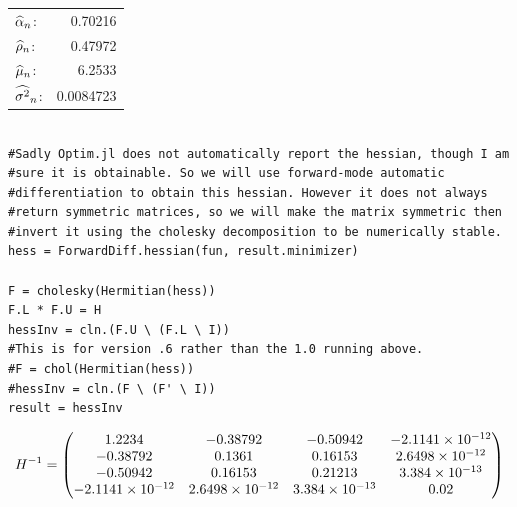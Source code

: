 \documentclass[12pt, letterpaper]{paper}
\begin{document}
\begin{center}
\begin{tabular}{lr}
\(\widehat{ \alpha }_{n}\): & 0.70216\\
\(\widehat{ \rho }_{n}\): & 0.47972\\
\(\widehat{ \mu }_{n}\): & 6.2533\\
\(\widehat{ \sigma^{2} }_{n}\): & 0.0084723\\
\end{tabular}
\end{center}

\begin{verbatim}

#Sadly Optim.jl does not automatically report the hessian, though I am
#sure it is obtainable. So we will use forward-mode automatic
#differentiation to obtain this hessian. However it does not always
#return symmetric matrices, so we will make the matrix symmetric then
#invert it using the cholesky decomposition to be numerically stable.
hess = ForwardDiff.hessian(fun, result.minimizer)

F = cholesky(Hermitian(hess))
F.L * F.U = H
hessInv = cln.(F.U \ (F.L \ I))
#This is for version .6 rather than the 1.0 running above.
#F = chol(Hermitian(hess))
#hessInv = cln.(F \ (F' \ I))
result = hessInv
\end{verbatim}

\begin{equation*}
  {H}^{-1} =
  \begin{pmatrix}
    1.2234 & -0.38792 & -0.50942 & -2.1141 \times 10^{-12}\\
-0.38792 & 0.1361 & 0.16153 & 2.6498 \times 10^{-12}\\
-0.50942 & 0.16153 & 0.21213 & 3.384 \times 10^{-13}\\
-2.1141 \times 10^{-12} & 2.6498 \times 10^{-12} & 3.384 \times 10^{-13} & 0.02
  \end{pmatrix}
\end{equation*}

\end{document}
